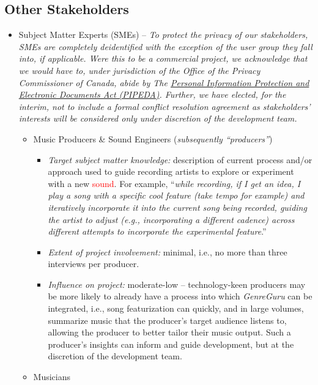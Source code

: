 \documentclass[12pt]{article}
\begin{document}
\subsection{Other Stakeholders} \label{2.3-other-stakeholders}
\begin{itemize}
  \item Subject Matter Experts (SMEs) -- \emph{To protect the privacy of our stakeholders, SMEs are completely deidentified with the exception of the user group they fall into, if applicable. Were this to be a commercial project, we acknowledge that we would have to, under jurisdiction of the Office of the Privacy Commissioner of Canada, abide by The \href{https://www.priv.gc.ca/en/privacy-topics/privacy-laws-in-canada/the-personal-information-protection-and-electronic-documents-act-pipeda/}{Personal Information Protection and Electronic Documents Act (PIPEDA)}. Further, we have elected, for the interim, not to include a formal conflict resolution agreement as stakeholders' interests will be considered only under discretion of the development team.}
  \begin{itemize}
    \item Music Producers \& Sound Engineers (\emph{subsequently ``producers''})
    \begin{itemize}
      \item \emph{Target subject matter knowledge:} description of current process and/or approach used to guide recording artists to explore or experiment with a new \textcolor{red}{sound}. For example, ``\emph{while recording, if I get an idea, I play a song with a specific cool feature (take tempo for example) and iteratively incorporate it into the current song being recorded, guiding the artist to adjust (e.g., incorporating a different cadence) across different attempts to incorporate the experimental feature}.''
      \item \emph{Extent of project involvement:} minimal, i.e., no more than three interviews per producer.
      \item \emph{Influence on project:} moderate-low -- technology-keen producers may be more likely to already have a process into which \emph{GenreGuru} can be integrated, i.e., song featurization can  quickly, and in large volumes, summarize music that the producer's target audience listens to, allowing the producer to better tailor their music output. Such a producer's insights can inform and guide development, but at the discretion of the development team.
    \end{itemize}
    \item Musicians

\end{itemize}
\end{itemize}
\end{document}
